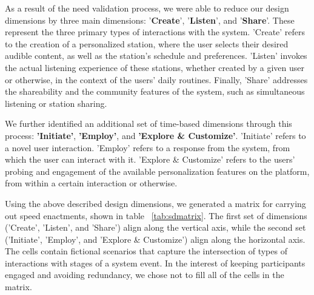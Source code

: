 {As a result of the need validation process, we were able to reduce our design dimensions by three main dimensions: '\textbf{Create}', '\textbf{Listen}', and '\textbf{Share}'. These represent the three primary types of interactions with the system. 'Create' refers to the creation of a personalized station, where the user selects their desired audible content, as well as the station's schedule and preferences. 'Listen' invokes the actual listening experience of these stations, whether created by a given user or otherwise, in the context of the users' daily routines. Finally, 'Share' addresses the shareability and the community features of the system, such as simultaneous listening or station sharing.

We further identified an additional set of time-based dimensions through this process: \textbf{'Initiate'}, \textbf{'Employ'}, and \textbf{'Explore \& Customize'}. 'Initiate' refers to a novel user interaction. 'Employ' refers to a response from the system, from which the user can interact with it. 'Explore \& Customize' refers to the users' probing and engagement of the available personalization features on the platform, from within a certain interaction or otherwise.

Using the above described design dimensions, we generated a matrix for carrying out speed enactments, shown in table ~\ref{tab:sdmatrix}. The first set of dimensions ('Create', 'Listen', and 'Share') align along the vertical axis, while the second set ('Initiate', 'Employ', and 'Explore \& Customize') align along the horizontal axis. The cells contain fictional scenarios that capture the intersection of types of interactions with stages of a system event. In the interest of keeping participants engaged and avoiding redundancy, we chose not to fill all of the cells in the matrix. 

}
